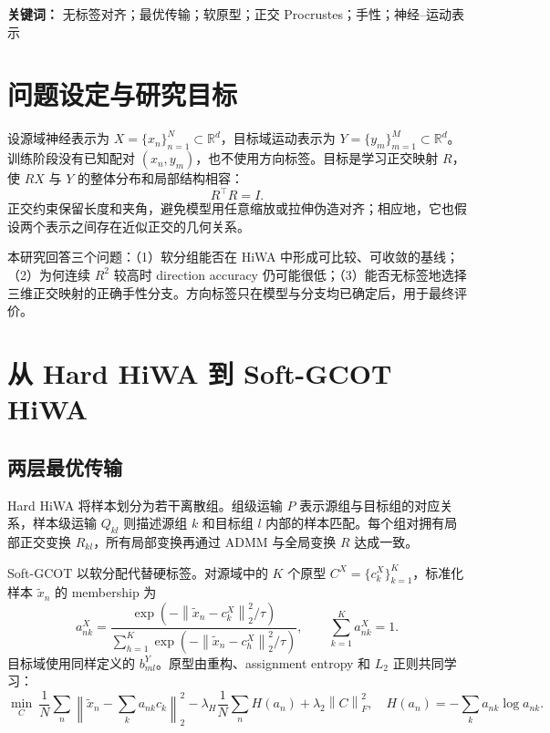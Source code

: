 \documentclass[UTF8,a4paper,11pt]{ctexart}
\newcommand{\R}{\mathbb{R}}
\newcommand{\norm}[1]{\left\lVert #1\right\rVert}
\begin{document}
\noindent\textbf{关键词：} 无标签对齐；最优传输；软原型；正交 Procrustes；手性；神经--运动表示

\tableofcontents
\newpage

\section{问题设定与研究目标}
设源域神经表示为 $X=\{x_n\}_{n=1}^{N}\subset\R^d$，目标域运动表示为 $Y=\{y_m\}_{m=1}^{M}\subset\R^d$。训练阶段没有已知配对 $(x_n,y_m)$，也不使用方向标签。目标是学习正交映射 $R$，使 $RX$ 与 $Y$ 的整体分布和局部结构相容：
\begin{equation}
R^\top R=I.
\end{equation}
正交约束保留长度和夹角，避免模型用任意缩放或拉伸伪造对齐；相应地，它也假设两个表示之间存在近似正交的几何关系。

本研究回答三个问题：（1）软分组能否在 HiWA 中形成可比较、可收敛的基线；（2）为何连续 $R^2$ 较高时 direction accuracy 仍可能很低；（3）能否无标签地选择三维正交映射的正确手性分支。方向标签只在模型与分支均已确定后，用于最终评价。

\section{从 Hard HiWA 到 Soft-GCOT HiWA}
\subsection{两层最优传输}
Hard HiWA 将样本划分为若干离散组。组级运输 $P$ 表示源组与目标组的对应关系，样本级运输 $Q_{kl}$ 则描述源组 $k$ 和目标组 $l$ 内部的样本匹配。每个组对拥有局部正交变换 $R_{kl}$，所有局部变换再通过 ADMM 与全局变换 $R$ 达成一致。

Soft-GCOT 以软分配代替硬标签。对源域中的 $K$ 个原型 $C^X=\{c_k^X\}_{k=1}^K$，标准化样本 $\tilde x_n$ 的 membership 为
\begin{equation}
a_{nk}^{X}=
\frac{\exp(-\norm{\tilde{x}_n-c_k^X}_2^2/\tau)}
{\sum_{h=1}^{K}\exp(-\norm{\tilde{x}_n-c_h^X}_2^2/\tau)},
\qquad \sum_{k=1}^{K}a_{nk}^{X}=1.
\end{equation}
目标域使用同样定义的 $b_{ml}^{Y}$。原型由重构、assignment entropy 和 $L_2$ 正则共同学习：
\begin{equation}
\min_C\ \frac1N\sum_n\norm{\tilde x_n-\sum_k a_{nk}c_k}_2^2
-\lambda_H\frac1N\sum_nH(a_n)+\lambda_2\norm{C}_F^2,
\quad H(a_n)=-\sum_k a_{nk}\log a_{nk}.
\end{equation}
\end{document}
